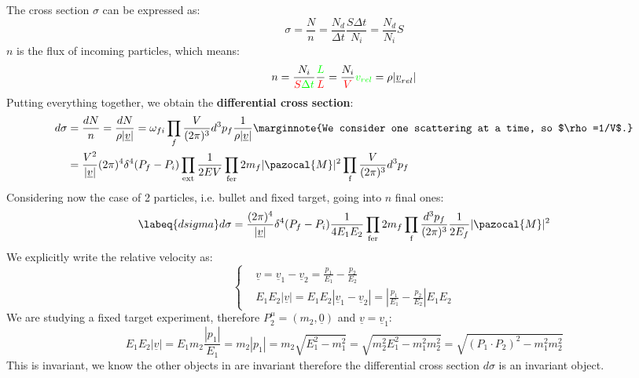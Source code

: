 \documentclass[../main.tex]{subfiles}
\begin{document}
The cross section $\sigma$ can be expressed as:
\[
\sigma=\frac{N}{n}=\frac{N_d}{\Delta t}\frac{S\Delta t}{N_i}=\frac{N_d}{N_i}S
\]
$n$ is the flux of incoming particles, which means:
\[
n=\frac{N_i}{{\color{red}S}{\color{green}\Delta t}}\frac{{\color{green}L}}{{\color{red}L}}=\frac{N_i}{{\color{red}V}}{\color{green}v_{rel}}=\rho|\underline{v}_{rel}|
\]
Putting everything together, we obtain the \textbf{differential cross section}:
\begin{align*}
d\sigma&=\frac{dN}{n}=\frac{dN}{\rho|\underline{v}|}=\omega_{fi}\prod_f\frac{V}{(2\pi)^3}d^3p_f\frac{1}{\rho|\underline{v}|}\marginnote{We consider one scattering at a time, so $\rho=1/V$.}\\
&=\frac{V^2}{|\underline{v}|}(2\pi)^4\delta^4(P_f-P_i)\prod_{\text{ext}}\frac{1}{2EV}\prod_{\text{fer}}2m_f|\pazocal{M}|^2\prod_{\text{f}}\frac{V}{(2\pi)^3}d^3p_f
\end{align*}
Considering now the case of 2 particles, i.e. bullet and fixed target, going into $n$ final ones:
\begin{equation}
\labeq{dsigma}
d\sigma=\frac{(2\pi)^4}{|\underline{v}|}\delta^4(P_f-P_i)\frac{1}{4E_1E_2}\prod_{\text{fer}}2m_f\prod_{\text{f}}\frac{d^3p_f}{(2\pi)^3}\frac{1}{2E_f}|\pazocal{M}|^2
\end{equation}
We explicitly write the relative velocity as:
\[
\left\{
\begin{aligned}
&\underline{v}=\underline{v}_1-\underline{v}_2=\frac{p_1}{E_1}-\frac{p_2}{E_2}\\
&E_1E_2|\underline{v}|=E_1E_2|\underline{v}_1-\underline{v}_2|=\left|\frac{p_1}{E_1}-\frac{p_2}{E_2}\right|E_1E_2
\end{aligned}
\right.
\]
We are studying a fixed target experiment, therefore $P_2^\mu=(m_2,\underline{0})$ and $\underline{v}=\underline{v}_1$:
\[
E_1E_2|\underline{v}|=E_1m_2\frac{|p_1|}{E_1}=m_2|p_1|=m_2\sqrt{E_1^2-m_1^2}=\sqrt{m_2^2E_1^2-m_1^2m_2^2}=\sqrt{(P_1\cdot P_2)^2-m_1^2m_2^2}
\]
This is invariant, we know the other objects in  are invariant therefore the differential cross section $d\sigma$ is an invariant object.
\end{document}
